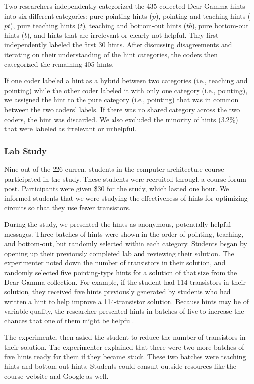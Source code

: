 Two researchers independently categorized the 435 collected Dear Gamma hints into six different categories: pure pointing hints ($p$), pointing and teaching hints ($pt$), pure teaching hints ($t$), teaching and bottom-out hints ($tb$), pure bottom-out hints ($b$), and hints that are irrelevant or clearly not helpful. They first independently labeled the first 30 hints. After discussing disagreements and iterating on their understanding of the hint categories, the coders then categorized the remaining 405 hints. 

If one coder labeled a hint as a hybrid between two categories (i.e., teaching and pointing) while the other coder labeled it with only one category (i.e., pointing), we assigned the hint to the pure category (i.e., pointing) that was in common between the two coders' labels. If there was no shared category across the two coders, the hint was discarded. We also excluded the minority of hints (3.2\%) that were labeled as irrelevant or unhelpful.

\subsubsection{Lab Study}

Nine out of the 226 current students in the computer architecture course participated in the study. These students were recruited through a course forum post. Participants were given \$30 for the study, which lasted one hour. We informed students that we were studying the effectiveness of hints for optimizing circuits so that they use fewer transistors.

During the study, we presented the hints as anonymous, potentially helpful messages. Three batches of hints were shown in the order of pointing, teaching, and bottom-out, but randomly selected within each category. Students began by opening up their previously completed lab and reviewing their solution. The experimenter noted down the number of transistors in their solution, and randomly selected five pointing-type hints for a solution of that size from the Dear Gamma collection. For example, if the student had 114 transistors in their solution, they received five hints previously generated by students who had written a hint to help improve a 114-transistor solution. Because hints may be of variable quality, the researcher presented hints in batches of five to increase the chances that one of them might be helpful.

The experimenter then asked the student to reduce the number of transistors in their solution. The experimenter explained that there were two more batches of five hints ready for them if they became stuck. These two batches were teaching hints and bottom-out hints. Students could consult outside resources like the course website and Google as well. 

